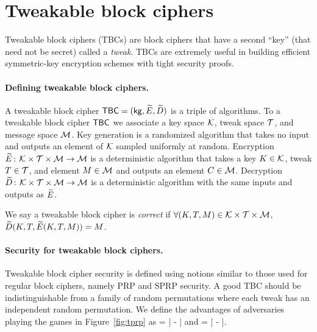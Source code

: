 



\section{Tweakable block ciphers}
\label{sec:tbcs}

Tweakable block ciphers (TBCs) are block ciphers that have a second ``key'' (that need not be secret) called a \emph{tweak}. TBCs are extremely useful in building efficient symmetric-key encryption schemes with tight security proofs.




\paragraph{Defining tweakable block ciphers.} A tweakable block cipher $\mathsf{TBC} = ({\sf kg}, \widetilde{E}, \widetilde{D})$ is a triple of 
algorithms. To a tweakable block cipher $\mathsf{TBC}$ we associate a key space ${\cal K}$, tweak space $\mathcal{T}$, and message space ${\cal M}$. Key generation is a randomized algorithm that takes no input and outputs an element of ${\cal K}$ sampled uniformly at random. Encryption $\widetilde{E}{{\kern .05em}\colon{\kern .05em}}{\cal K}\times\mathcal{T}\times{\cal M}\rightarrow{\cal M}$ is a deterministic algorithm that takes a key $K\in{\cal K}$, tweak $T\in\mathcal{T}$, and element $M\in{\cal M}$ and outputs an element $C\in{\cal M}$. Decryption $\widetilde{D}{{\kern .05em}\colon{\kern .05em}}{\cal K}\times\mathcal{T}\times{\cal M}\rightarrow{\cal M}$ is a deterministic algorithm with the same inputs and outputs as $\widetilde{E}$.

We say a tweakable block cipher is \emph{correct} if $\forall (K, T, M)\in{\cal K}\times\mathcal{T}\times{\cal M}$, $\widetilde{D}(K, T, \widetilde{E}(K, T, M))=M$.

\paragraph{Security for tweakable block ciphers.}


Tweakable block cipher security is defined using notions similar to those used for regular block ciphers, namely PRP and SPRP security. A good TBC should be indistinguishable from a family of random permutations where each tweak has an independent random permutation. We define the advantages of adversaries playing the games in Figure~\ref{fig:tprp} as 
\bnm
\AdvSTPRP{\tweakCipher}{\advA} = \left| -
 \right|
\enm
and
\bnm
\AdvTSPRP{\tweakCipher}{\advA} = \left| -
 \right|\;.
\enm

